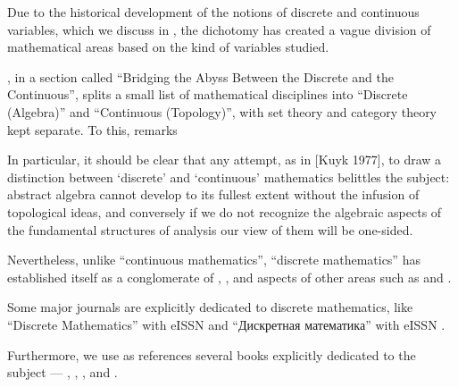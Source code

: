 \begin{remark}\label{rem:discrete_mathematics}
  Due to the historical development of the notions of discrete and continuous variables, which we discuss in , the dichotomy has created a vague division of mathematical areas based on the kind of variables studied.

  , in a section called \enquote{Bridging the Abyss Between the Discrete and the Continuous}, splits a small list of mathematical disciplines into \enquote{Discrete (Algebra)} and \enquote{Continuous (Topology)}, with set theory and category theory kept separate. To this,  remarks
  \begin{displayquote}
    In particular, it should be clear that any attempt, as in [Kuyk 1977], to draw a distinction between \enquote*{discrete} and \enquote*{continuous} mathematics belittles the subject: abstract algebra cannot develop to its fullest extent without the infusion of topological ideas, and conversely if we do not recognize the algebraic aspects of the fundamental structures of analysis our view of them will be one-sided.
  \end{displayquote}

  Nevertheless, unlike \enquote{continuous mathematics}, \enquote{discrete mathematics} has established itself as a conglomerate of , ,  and aspects of other areas such as  and .

  Some major journals are explicitly dedicated to discrete mathematics, like \enquote{Discrete Mathematics} with eISSN  and \enquote{Дискретная математика} with eISSN .

  Furthermore, we use as references several books explicitly dedicated to the subject --- , , ,  and .
\end{remark}

